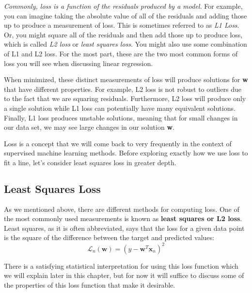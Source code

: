 \textit{Commonly, loss is a function of the residuals produced by a model.} For example, you can imagine taking the absolute value of all of the residuals and adding those up to produce a measurement of loss. This is sometimes referred to as \textit{L1 Loss}. Or, you might square all of the residuals and then add those up to produce loss, which is called \textit{L2 loss} or \textit{least squares loss}. You might also use some combination of L1 and L2 loss. For the most part, these are the two most common forms of loss you will see when discussing linear regression.

When minimized, these distinct measurements of loss will produce solutions for \textbf{w} that have different properties. For example, L2 loss is not robust to outliers due to the fact that we are squaring residuals. Furthermore, L2 loss will produce only a single solution while L1 loss can potentially have many equivalent solutions. Finally, L1 loss produces unstable solutions, meaning that for small changes in our data set, we may see large changes in our solution \textbf{w}.

Loss is a concept that we will come back to very frequently in the context of supervised machine learning methods. Before exploring exactly how we use loss to fit a line, let's consider least squares loss in greater depth.

\subsection{Least Squares Loss}
As we mentioned above, there are different methods for computing loss. One of the most commonly used measurements is known as \textbf{least squares or L2 loss}. Least squares, as it is often abbreviated, says that the loss for a given data point is the square of the difference between the target and predicted values:
\begin{equation} \label{least-squares-loss-fn}
    \mathcal{L}_{n}(\textbf{w}) = (y - \textbf{w}^{T}\textbf{x}_{n})^2
\end{equation}


There is a satisfying statistical interpretation for using this loss function which we will explain later in this chapter, but for now it will suffice to discuss some of the properties of this loss function that make it desirable.

